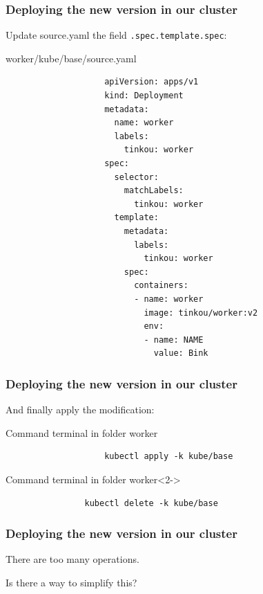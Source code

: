 	\begin{frame}[fragile]
		\frametitle{Deploying the new version in our cluster}
		
		Update source.yaml the field \verb!.spec.template.spec!:
		\begin{block}{worker/kube/base/source.yaml}
			\begin{tiny}
				\begin{verbatim}
					apiVersion: apps/v1
					kind: Deployment
					metadata:
					  name: worker
					  labels:
					    tinkou: worker
					spec:
					  selector:
					    matchLabels:
					      tinkou: worker
					  template:
					    metadata:
					      labels:
					        tinkou: worker
					    spec:
					      containers:
					      - name: worker
					        image: tinkou/worker:v2
					        env:
					        - name: NAME
					          value: Bink
				\end{verbatim}
			\end{tiny}
		\end{block}
	\end{frame}
	
	\begin{frame}[fragile]
		\frametitle{Deploying the new version in our cluster}
			
		And finally apply the modification:
		\begin{block}{Command terminal in folder worker}
			\begin{small}
					\begin{verbatim}
					kubectl apply -k kube/base
				\end{verbatim}
			\end{small}
		\end{block}
		
		\bigskip
		
		\begin{block}{Command terminal in folder worker}<2->
			\begin{verbatim}
				kubectl delete -k kube/base
			\end{verbatim}
		\end{block}
	\end{frame}
	
	\begin{frame}
		\frametitle{Deploying the new version in our cluster}
		
		There are too many operations.
		
		\bigskip
		Is there a way to simplify this?
	\end{frame}
	
